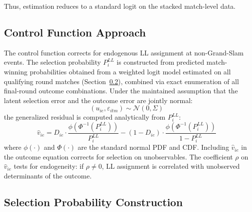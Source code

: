Thus, estimation reduces to a standard logit on the stacked match-level data.

\subsection{Control Function Approach}
\label{app:first_stage}

The control function corrects for endogenous LL assignment at non-Grand-Slam events. The selection probability $P_i^{LL}$ is constructed from predicted match-winning probabilities obtained from a weighted logit model estimated on all qualifying round matches (Section~\ref{app:instrument}), combined via exact enumeration of all final-round outcome combinations. Under the maintained assumption that the latent selection error and the outcome error are jointly normal:
\begin{equation}
(u_{ie}, \varepsilon_{itm}) \sim \mathcal{N}(0, \Sigma)
\end{equation}
the generalized residual is computed analytically from $P_i^{LL}$:
\begin{equation}
\hat{v}_{ie} = D_{ie} \cdot \frac{\phi(\Phi^{-1}(P_i^{LL}))}{P_i^{LL}} - (1 - D_{ie}) \cdot \frac{\phi(\Phi^{-1}(P_i^{LL}))}{1 - P_i^{LL}}
\end{equation}
where $\phi(\cdot)$ and $\Phi(\cdot)$ are the standard normal PDF and CDF. Including $\hat{v}_{ie}$ in the outcome equation corrects for selection on unobservables. The coefficient $\rho$ on $\hat{v}_{ie}$ tests for endogeneity: if $\rho \neq 0$, LL assignment is correlated with unobserved determinants of the outcome.

\subsection{Selection Probability Construction}
\label{app:instrument}

